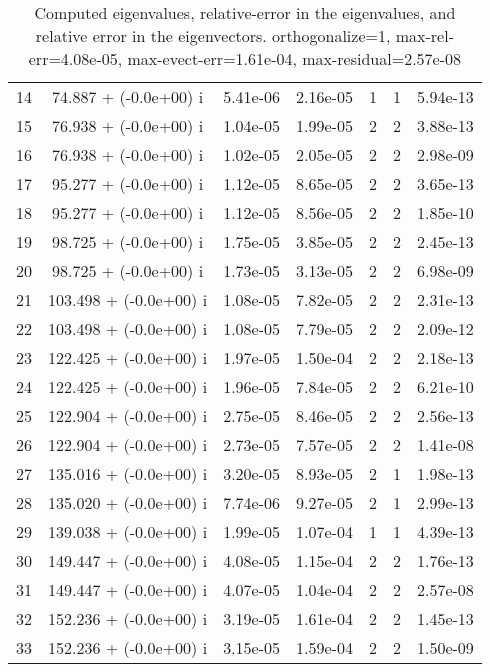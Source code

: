 \begin{table}[H]
\begin{center}
\begin{tabular}{|c|c|c|c|c|c|c|}
    14  &     74.887 + (-0.0e+00) i  &    5.41e-06      &   2.16e-05    &   1    &  1   &    5.94e-13 \\
    15  &     76.938 + (-0.0e+00) i  &    1.04e-05      &   1.99e-05    &   2    &  2   &    3.88e-13 \\
    16  &     76.938 + (-0.0e+00) i  &    1.02e-05      &   2.05e-05    &   2    &  2   &    2.98e-09 \\
    17  &     95.277 + (-0.0e+00) i  &    1.12e-05      &   8.65e-05    &   2    &  2   &    3.65e-13 \\
    18  &     95.277 + (-0.0e+00) i  &    1.12e-05      &   8.56e-05    &   2    &  2   &    1.85e-10 \\
    19  &     98.725 + (-0.0e+00) i  &    1.75e-05      &   3.85e-05    &   2    &  2   &    2.45e-13 \\
    20  &     98.725 + (-0.0e+00) i  &    1.73e-05      &   3.13e-05    &   2    &  2   &    6.98e-09 \\
    21  &    103.498 + (-0.0e+00) i  &    1.08e-05      &   7.82e-05    &   2    &  2   &    2.31e-13 \\
    22  &    103.498 + (-0.0e+00) i  &    1.08e-05      &   7.79e-05    &   2    &  2   &    2.09e-12 \\
    23  &    122.425 + (-0.0e+00) i  &    1.97e-05      &   1.50e-04    &   2    &  2   &    2.18e-13 \\
    24  &    122.425 + (-0.0e+00) i  &    1.96e-05      &   7.84e-05    &   2    &  2   &    6.21e-10 \\
    25  &    122.904 + (-0.0e+00) i  &    2.75e-05      &   8.46e-05    &   2    &  2   &    2.56e-13 \\
    26  &    122.904 + (-0.0e+00) i  &    2.73e-05      &   7.57e-05    &   2    &  2   &    1.41e-08 \\
    27  &    135.016 + (-0.0e+00) i  &    3.20e-05      &   8.93e-05    &   2    &  1   &    1.98e-13 \\
    28  &    135.020 + (-0.0e+00) i  &    7.74e-06      &   9.27e-05    &   2    &  1   &    2.99e-13 \\
    29  &    139.038 + (-0.0e+00) i  &    1.99e-05      &   1.07e-04    &   1    &  1   &    4.39e-13 \\
    30  &    149.447 + (-0.0e+00) i  &    4.08e-05      &   1.15e-04    &   2    &  2   &    1.76e-13 \\
    31  &    149.447 + (-0.0e+00) i  &    4.07e-05      &   1.04e-04    &   2    &  2   &    2.57e-08 \\
    32  &    152.236 + (-0.0e+00) i  &    3.19e-05      &   1.61e-04    &   2    &  2   &    1.45e-13 \\
    33  &    152.236 + (-0.0e+00) i  &    3.15e-05      &   1.59e-04    &   2    &  2   &    1.50e-09 \\
\hline
\end{tabular}
\caption{Computed eigenvalues, relative-error in the eigenvalues, and relative error in the eigenvectors. orthogonalize=1, max-rel-err=4.08e-05, max-evect-err=1.61e-04, max-residual=2.57e-08
}\label{table:genEigssice4.order4.ng3.hdf}
\end{center}
\end{table}
